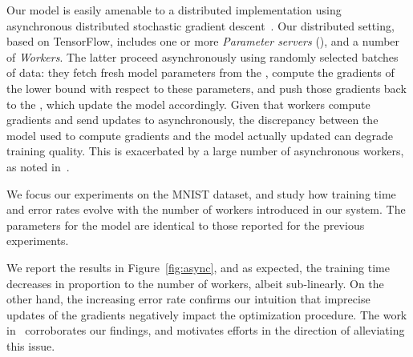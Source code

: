 Our model is easily amenable to a distributed implementation using asynchronous distributed stochastic gradient descent~\citet{Chilimbi14}. %
Our distributed setting, %
based on TensorFlow, includes one or more \emph{Parameter servers} (), and a number of \emph{Workers}. 
The latter proceed asynchronously using randomly selected batches of data: they fetch fresh model parameters from the , compute the gradients of the lower bound with respect to these parameters, and push those gradients back to the , which update the model accordingly. 
Given that workers compute gradients and send updates to  asynchronously, the  discrepancy between the model used to compute gradients and the model actually updated can degrade training quality. 
This is exacerbated by a large number of asynchronous workers, as noted in~\citet{Chen16}.

We focus our experiments on the MNIST dataset, and study how training time and error rates evolve with the number of workers introduced in our system. 
The parameters for the model are identical to those reported for the previous experiments.



We report the results in Figure~\ref{fig:async}, and as expected, the training time decreases in proportion to the number of workers, albeit sub-linearly.
On the other hand, the increasing error rate confirms our intuition that imprecise updates of the gradients negatively impact the optimization procedure. 
The work in~\citet{Chen16} corroborates our findings, and motivates efforts in the direction of alleviating this issue.
